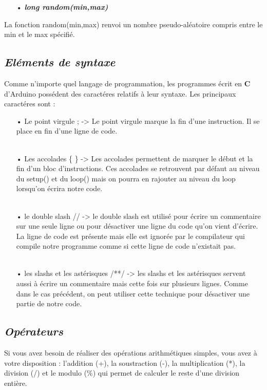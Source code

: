 \documentclass[12pt,a4paper]{article}
\begin{document}
\begin{itemize}
\bigskip
    \item[•] \textit{\textbf{long random(min,max)}}
\end{itemize}
La fonction random(min,max) renvoi un nombre pseudo-aléatoire compris entre le min et le max spécifié.

\bigskip
\subsection{\textit{\textbf{Eléments de syntaxe}}}
Comme n’importe quel langage de programmation, les programmes écrit en \textbf{C} d’Arduino possédent des caractéres relatifs à leur syntaxe. Les principaux caractéres sont :

\begin{itemize}
\bigskip
    \item[•] Le point virgule ; -> Le point virgule marque la fin d’une instruction. Il se place en fin d’une ligne de code.
    \\
    \\
    \item[•] Les accolades \{ \} -> Les accolades permettent de marquer le début et la fin d’un bloc d’instructions. Ces accolades se retrouvent par défaut au niveau du setup() et du loop() mais on pourra en rajouter au niveau du loop lorsqu’on écrira notre code.
    \\
    \\
    \item[•] le double slash // -> le double slash est utilisé pour écrire un commentaire sur une seule ligne ou pour désactiver une ligne du code qu’on vient d’écrire. La ligne de code est présente mais elle est ignorée par le compilateur qui compile notre programme comme si cette ligne de code n’existait pas.
    \\
    \\
     \item[•] les slashs et les astérisques /**/ -> les slashs et les astérisques servent aussi à écrire un commentaire mais cette fois sur plusieurs lignes. Comme dans le cas précédent, on peut utiliser cette technique pour désactiver une partie de notre code.

\end{itemize}

\subsection{\textit{\textbf{Opérateurs}}}
Si vous avez besoin de réaliser des opérations arithmétiques simples, vous avez à votre disposition : l’addition (+), la soustraction (-), la multiplication (*), la division (/) et le modulo (\%) qui permet de calculer le reste d’une division entière.
\end{document}
